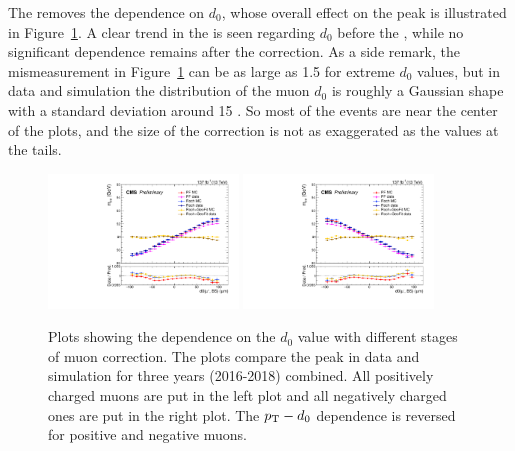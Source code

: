 The \GeoFit removes the \pt dependence on $d_0$, 
whose overall effect on the \zmm peak is illustrated in Figure~\ref{fig:mucal_d0_run2}.
A clear trend in the \mmm is seen regarding $d_0$ before the \GeoFit, 
while no significant dependence remains after the correction.
As a side remark, the \mmm mismeasurement in Figure~\ref{fig:mucal_d0_run2} can be as large as 1.5 \GeV for extreme $d_0$ values,
but in data and simulation the distribution of the muon $d_0$ is roughly a Gaussian shape with a standard deviation around 15 \mum.
So most of the events are near the center of the plots, and the size of the correction is not as exaggerated as the values at the tails. 

\begin{figure}[!htb]
      \centering
      \captionsetup{justification=justified}
      \includegraphics[width=0.45\textwidth]{pics/muon_corr/GeoFit/performance/muP_d0_summary_mean.pdf}
      \includegraphics[width=0.45\textwidth]{pics/muon_corr/GeoFit/performance/muN_d0_summary_mean.pdf}
      \caption{Plots showing the \pt dependence on the $d_0$ value with different stages of muon correction.
               The plots compare the \zmm peak in data and simulation for three years (2016-2018) combined.
               All positively charged muons are put in the left plot and all negatively charged ones are put in the right plot.
               The $p_{\mathrm{T}}-d_0$ dependence is reversed for positive and negative muons.
               }
      \label{fig:mucal_d0_run2}
\end{figure}


